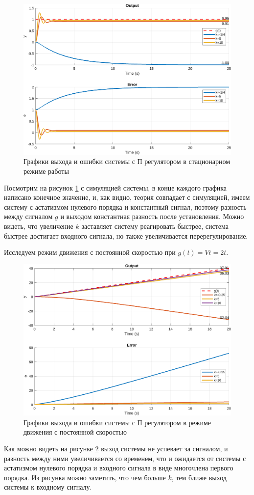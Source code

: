 \begin{figure}[H]
    \centering
    \includegraphics[width=1\textwidth]{figs/task_3_out.png}
    \caption{Графики выхода и ошибки системы с П регулятором в стационарном режиме работы}
    \label{fig:task_3_out}
\end{figure}
Посмотрим на рисунок \ref{fig:task_3_out} с симуляцией системы, в конце каждого графика
написано конечное значение, и, как видно, теория совпадает с симуляцией, имеем 
систему с астатизмом нулевого порядка и константный сигнал, поэтому разность
между сигналом $g$ и выходом константная разность после установления. Можно
видеть, что увеличение $k$ заставляет систему реагировать быстрее, система быстрее
достигает входного сигнала, но также увеличивается перерегулирование.

Исследуем режим движения с постоянной скоростью при $g(t) = Vt=2t$. 
\begin{figure}[H]
    \centering
    \includegraphics[width=1\textwidth]{figs/task_3_out_1.png}
    \caption{Графики выхода и ошибки системы с П регулятором в режиме движения с постоянной скоростью}
    \label{fig:task_3_out_1}
\end{figure}
Как можно видеть на рисунке \ref{fig:task_3_out_1} выход системы не успевает за сигналом,
и разность между ними увеличивается со временем, что и ожидается от системы с астатизмом
нулевого порядка и входного сигнала в виде многочлена первого порядка. Из рисунка
можно заметить, что чем больше $k$, тем ближе выход системы к входному сигналу.


